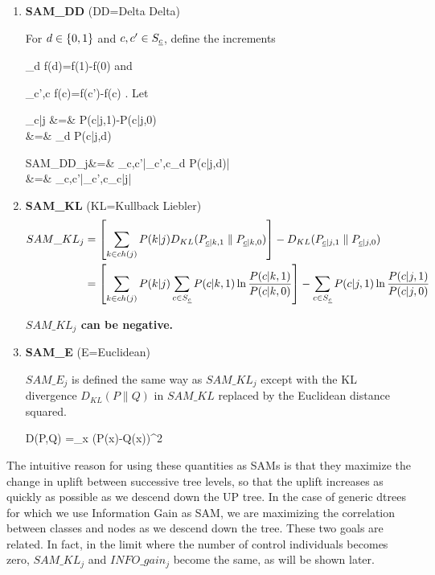 \begin{enumerate}
\item{\bf SAM\_DD} (DD=Delta Delta)

For $d\in \{0,1\}$
and $c, c'\in S_{\underline{c}}$, define the increments

\beq
\partial_d f(d)=f(1)-f(0)
\eeq
and

\beq
\partial_{c',c} f(c)=f(c')-f(c)
\;.
\eeq
Let

\beqa
\Delta_{c|j} &=& P(c|j,1)-P(c|j,0)
\\
&=& \partial_d P(c|j,d)
\label{eq-delta-c-j}
\eeqa

\beqa
SAM\_DD_j&=& \max_{c,c'}|\partial_{c',c}\partial_d P(c|j,d)|
\\
&=&
\max_{c,c'}|\partial_{c',c}\Delta_{c|j}|
\eeqa

\item{\bf SAM\_KL} (KL=Kullback Liebler)
\begin{align}
SAM\_KL_j&=
\left[
\sum_{k\in ch(j)}
P(k|j)
D_{KL}(P_{{\underline{c}}|k,1}\parallel P_{{\underline{c}}|k,0})
\right]
-
D_{KL}(P_{{\underline{c}}|j,1}\parallel P_{{\underline{c}}|j,0})
\\
&=
\left[
\sum_{k\in ch(j)}
P(k|j)
 \sum_{c\in S_{\underline{c}}}P(c|k,1) 
\ln \frac{P(c|k,1) }{ P(c|k,0) }
\right]
-
\sum_{c\in S_{\underline{c}}} 
P(c|j,1) 
\ln \frac{P(c|j,1) }{ P(c|j,0) }
\label{eq-sam-kl}
\end{align}

{\bf $SAM\_KL_j$ can be negative.}

\item {\bf SAM\_E} (E=Euclidean)

$SAM\_E_j$ is defined the same way as $SAM\_KL_j$
except with 
the KL divergence $D_{KL}(P\parallel Q)$ 
in $SAM\_KL$ replaced 
by the Euclidean distance squared. 


\beq
D(P,Q) =\sum_x (P(x)-Q(x))^2
\eeq

\end{enumerate}

The intuitive reason for
 using these quantities as
SAMs is that they maximize the change in uplift 
between 
successive tree levels, so 
that the uplift increases as quickly as possible
as we descend down the UP tree.
In the case of generic dtrees
for which we use Information Gain as SAM, we 
are maximizing the correlation
between classes and nodes as we descend down the tree. 
These two goals are related.
In fact, in the limit
where the
number of control individuals
becomes zero,
$SAM\_KL_j$ and $INFO\_gain_j$
become the same, as will be shown later.

